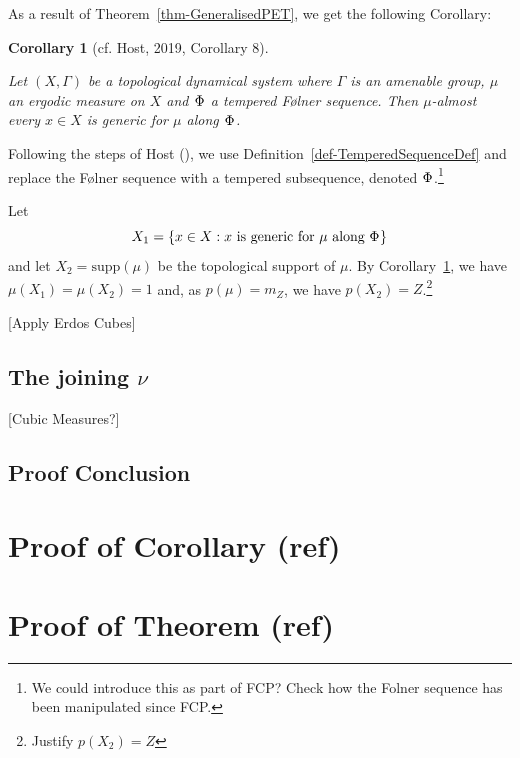 \documentclass[
  british,
]{article}
\theoremstyle{definition}
\theoremstyle{plain}
\newtheorem{corollary}{Corollary}[section]
\theoremstyle{plain}
\theoremstyle{plain}
\theoremstyle{remark}
\newcommand{\AmenableGroup}{{\Gamma}}
\newcommand{\Folner}[1][\vphantom{}]{{\Phi}_{#1}}
\newcommand{\KroneckerFactorMap}{p}
\newcommand{\KroneckerMeasure}{{m_Z}}
\newcommand{\KroneckerSpace}{{Z}}
\newcommand{\Measure}{{\mu}}
\newcommand{\ShiftSpace}{{X}}
\newcommand{\ShiftSpaceElement}{{x}}
\begin{document}
As a result of Theorem~\ref{thm-GeneralisedPET}, we get the following
Corollary:

\begin{corollary}[{cf. Host, 2019, Corollary
8}]\protect\hypertarget{cor-temperedGenericCor}{}\label{cor-temperedGenericCor}

Let \((X,\AmenableGroup)\) be a topological dynamical system where
\(\AmenableGroup\) is an amenable group, \(\Measure\) an ergodic measure
on \(X\) and \(\Folner\) a tempered Følner sequence. Then
\(\Measure\)-almost every \(x\in X\) is generic for \(\Measure\) along
\(\Folner\).

\end{corollary}

Following the steps of Host (), we use
Definition~\ref{def-TemperedSequenceDef} and replace the Følner sequence
with a tempered subsequence, denoted \(\Folner\).\footnote{We could
  introduce this as part of FCP? Check how the Folner sequence has been
  manipulated since FCP.}

Let
\[X_1=\{\ShiftSpaceElement\in\ShiftSpace:\ShiftSpaceElement\text{ is generic for }\mu\text{ along }\Folner\}\]
and let \(X_2=\text{supp}(\Measure)\) be the topological support of
\(\Measure\). By Corollary~\ref{cor-temperedGenericCor}, we have
\(\Measure(X_1)=\Measure(X_2)=1\) and, as
\(\KroneckerFactorMap(\Measure)=\KroneckerMeasure\), we have
\(\KroneckerFactorMap(X_2)=\KroneckerSpace\).\footnote{Justify
  \(\KroneckerFactorMap(X_2)=\KroneckerSpace\)}

{[}Apply Erdos Cubes{]}

\subsection{\texorpdfstring{The joining
\(\nu\)}{The joining \textbackslash nu}}\label{the-joining-nu}

{[}Cubic Measures?{]}

\subsection{Proof Conclusion}\label{proof-conclusion}

\section{Proof of Corollary (ref)}\label{proof-of-corollary-ref}

\section{Proof of Theorem (ref)}\label{proof-of-theorem-ref}
\end{document}

